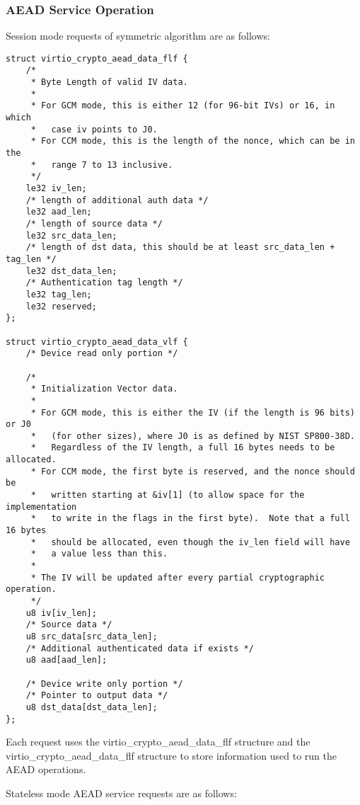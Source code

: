 \subsubsection{AEAD Service Operation}\label{sec:Device Types / Crypto Device / Device Operation / AEAD Service Operation}

Session mode requests of symmetric algorithm are as follows:

\begin{lstlisting}
struct virtio_crypto_aead_data_flf {
    /*
     * Byte Length of valid IV data.
     *
     * For GCM mode, this is either 12 (for 96-bit IVs) or 16, in which
     *   case iv points to J0.
     * For CCM mode, this is the length of the nonce, which can be in the
     *   range 7 to 13 inclusive.
     */
    le32 iv_len;
    /* length of additional auth data */
    le32 aad_len;
    /* length of source data */
    le32 src_data_len;
    /* length of dst data, this should be at least src_data_len + tag_len */
    le32 dst_data_len;
    /* Authentication tag length */
    le32 tag_len;
    le32 reserved;
};

struct virtio_crypto_aead_data_vlf {
    /* Device read only portion */

    /*
     * Initialization Vector data.
     *
     * For GCM mode, this is either the IV (if the length is 96 bits) or J0
     *   (for other sizes), where J0 is as defined by NIST SP800-38D.
     *   Regardless of the IV length, a full 16 bytes needs to be allocated.
     * For CCM mode, the first byte is reserved, and the nonce should be
     *   written starting at &iv[1] (to allow space for the implementation
     *   to write in the flags in the first byte).  Note that a full 16 bytes
     *   should be allocated, even though the iv_len field will have
     *   a value less than this.
     *
     * The IV will be updated after every partial cryptographic operation.
     */
    u8 iv[iv_len];
    /* Source data */
    u8 src_data[src_data_len];
    /* Additional authenticated data if exists */
    u8 aad[aad_len];

    /* Device write only portion */
    /* Pointer to output data */
    u8 dst_data[dst_data_len];
};
\end{lstlisting}

Each request uses the virtio_crypto_aead_data_flf structure and the
virtio_crypto_aead_data_flf structure to store information used to run the
AEAD operations.

Stateless mode AEAD service requests are as follows:

